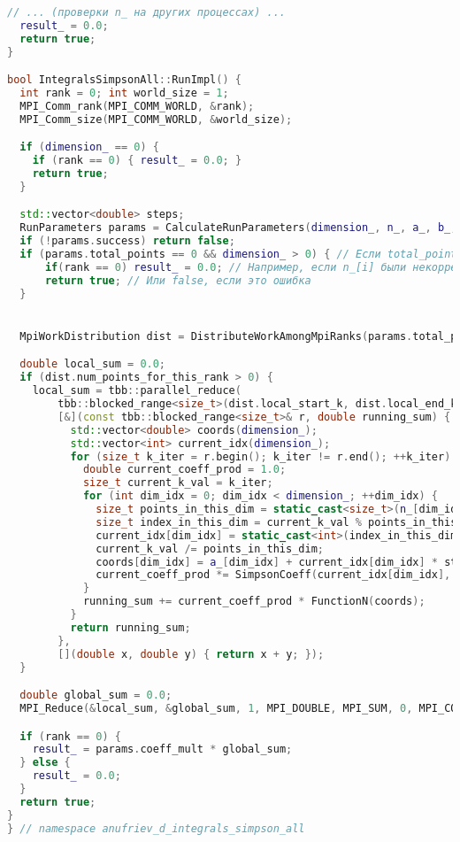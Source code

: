 \documentclass[a4paper,12pt]{article}
\begin{document}
\begin{lstlisting}[language=C++, caption=Ключевые функции из ops\_all.cpp, basicstyle=\ttfamily\tiny]
  // ... (проверки n_ на других процессах) ...
  result_ = 0.0;
  return true;
}

bool IntegralsSimpsonAll::RunImpl() {
  int rank = 0; int world_size = 1;
  MPI_Comm_rank(MPI_COMM_WORLD, &rank);
  MPI_Comm_size(MPI_COMM_WORLD, &world_size);

  if (dimension_ == 0) {
    if (rank == 0) { result_ = 0.0; }
    return true;
  }

  std::vector<double> steps; 
  RunParameters params = CalculateRunParameters(dimension_, n_, a_, b_, steps); // Из anonymous namespace
  if (!params.success) return false;
  if (params.total_points == 0 && dimension_ > 0) { // Если total_points == 0, но не из-за dim_ == 0
      if(rank == 0) result_ = 0.0; // Например, если n_[i] были некорректны
      return true; // Или false, если это ошибка
  }


  MpiWorkDistribution dist = DistributeWorkAmongMpiRanks(params.total_points, rank, world_size); // Из anonymous

  double local_sum = 0.0;
  if (dist.num_points_for_this_rank > 0) {
    local_sum = tbb::parallel_reduce(
        tbb::blocked_range<size_t>(dist.local_start_k, dist.local_end_k), 0.0,
        [&](const tbb::blocked_range<size_t>& r, double running_sum) {
          std::vector<double> coords(dimension_);
          std::vector<int> current_idx(dimension_);
          for (size_t k_iter = r.begin(); k_iter != r.end(); ++k_iter) {
            double current_coeff_prod = 1.0;
            size_t current_k_val = k_iter;
            for (int dim_idx = 0; dim_idx < dimension_; ++dim_idx) {
              size_t points_in_this_dim = static_cast<size_t>(n_[dim_idx]) + 1;
              size_t index_in_this_dim = current_k_val % points_in_this_dim;
              current_idx[dim_idx] = static_cast<int>(index_in_this_dim);
              current_k_val /= points_in_this_dim;
              coords[dim_idx] = a_[dim_idx] + current_idx[dim_idx] * steps[dim_idx];
              current_coeff_prod *= SimpsonCoeff(current_idx[dim_idx], n_[dim_idx]); // Из anonymous
            }
            running_sum += current_coeff_prod * FunctionN(coords);
          }
          return running_sum;
        },
        [](double x, double y) { return x + y; });
  }

  double global_sum = 0.0;
  MPI_Reduce(&local_sum, &global_sum, 1, MPI_DOUBLE, MPI_SUM, 0, MPI_COMM_WORLD);

  if (rank == 0) {
    result_ = params.coeff_mult * global_sum;
  } else {
    result_ = 0.0; 
  }
  return true;
}
} // namespace anufriev_d_integrals_simpson_all
\end{lstlisting}
\end{document}
